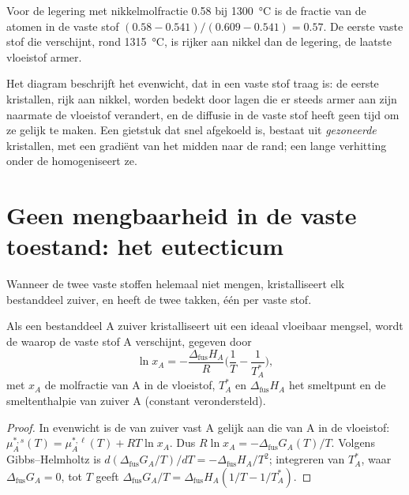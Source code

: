 \begin{example}\label{ex:b2:solid-liquid-diagrams:lever}
Voor de legering met nikkelmolfractie 0.58 bij \qty{1300}{\degreeCelsius} is de
fractie van de atomen in de vaste stof $(0.58 - 0.541)/(0.609 - 0.541) = 0.57$.
De eerste vaste stof die verschijnt, rond \qty{1315}{\degreeCelsius}, is rijker aan nikkel
dan de legering, de laatste vloeistof armer.
\end{example}

Het diagram beschrijft het evenwicht, dat in een vaste stof traag is: de eerste kristallen,
rijk aan nikkel, worden bedekt door lagen die er steeds armer aan zijn naarmate de vloeistof
verandert, en de diffusie in de vaste stof heeft geen tijd om ze gelijk te maken. Een gietstuk
dat snel afgekoeld is, bestaat uit \textit{gezoneerde} kristallen, met een gradiënt van het midden naar de
rand; een lange verhitting onder de  homogeniseert ze.

\section{Geen mengbaarheid in de vaste toestand: het eutecticum}

Wanneer de twee vaste stoffen helemaal niet mengen, kristalliseert elk bestanddeel zuiver, en
heeft de  twee takken, één per vaste stof.

\begin{theorem}\label{thm:b2:solid-liquid-diagrams:schroder}
Als een bestanddeel A zuiver kristalliseert uit een ideaal vloeibaar mengsel, wordt de 
waarop de vaste stof A verschijnt, gegeven door
\[
  \ln x_A = -\frac{\Delta_{\text{fus}}H_A}{R}\Big(\frac1T - \frac1{T_A^*}\Big),
\]
met $x_A$ de molfractie van A in de vloeistof, $T_A^*$ en
$\Delta_{\text{fus}}H_A$ het smeltpunt en de smeltenthalpie van zuiver A
(constant verondersteld).
\end{theorem}

\begin{proof}
In evenwicht is de  van zuiver vast A gelijk aan die van A in de
vloeistof: $\mu_A^{*,s}(T) = \mu_A^{*,\ell}(T) + RT\ln x_A$. Dus $R\ln x_A =
-\Delta_{\text{fus}}G_A(T)/T$. Volgens Gibbs--Helmholtz is $d(\Delta_{\text{fus}}G_A/T)/
dT = -\Delta_{\text{fus}}H_A/T^2$; integreren van $T_A^*$, waar
$\Delta_{\text{fus}}G_A = 0$, tot $T$ geeft $\Delta_{\text{fus}}G_A/T =
\Delta_{\text{fus}}H_A(1/T - 1/T_A^*)$.
\end{proof}

